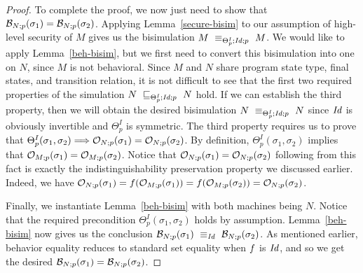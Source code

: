 \begin{proof}
To complete the proof, we now just need to show that 
$\behavior{N;p}{\sigma_1} = \behavior{N;p}{\sigma_2}$. Applying
Lemma~\ref{secure-bisim} to our assumption of high-level security of $M$
gives us the bisimulation $\bisimu{M}{M}{\Theta^{I}_p;\mathid;p}$.
We would like to apply Lemma~\ref{beh-bisim}, but we first need
to convert this bisimulation into one on $N$, since $M$ is not
behavioral. Since $M$ and $N$ share program state type, final states,
and transition relation, it is not difficult to see that the first
two required properties of the simulation $\simu{N}{N}{\Theta^{I}_p;\mathid;p}$ 
hold. If we can establish the third property, then we will obtain the
desired bisimulation $\bisimu{N}{N}{\Theta^{I}_p;\mathid;p}$ since $\mathid$ 
is obviously invertible and $\Theta^{I}_p$ is symmetric. The third
property requires us to prove that 
$\Theta^{I}_p(\sigma_1,\sigma_2) \Longrightarrow 
\observem{N}{p}{\sigma_1} = \observem{N}{p}{\sigma_2}$.
By definition, $\Theta^{I}_p(\sigma_1,\sigma_2)$ implies that
$\observem{M}{p}{\sigma_1} = \observem{M}{p}{\sigma_2}$.
Notice that $\observem{N}{p}{\sigma_1} = \observem{N}{p}{\sigma_2}$
following from this fact is exactly the indistinguishability 
preservation property we discussed earlier. Indeed, we
have $\observem{N}{p}{\sigma_1} = \obsrel{R}(\observem{M}{p}{\sigma_1}) = 
\obsrel{R}(\observem{M}{p}{\sigma_2}) = \observem{N}{p}{\sigma_2}$.

Finally, we instantiate Lemma~\ref{beh-bisim} with both machines
being $N$. Notice that the required
precondition $\Theta^{I}_p(\sigma_1,\sigma_2)$ holds by assumption.
Lemma~\ref{beh-bisim} now gives us the conclusion
$\bisimu{\behavior{N;p}{\sigma_1}}{\behavior{N;p}{\sigma_2}}{\mathid}$.
As mentioned earlier, behavior equality reduces to standard set
equality when $\obsrel{R}$ is $\mathid$, and so we get the desired
$\behavior{N;p}{\sigma_1} = \behavior{N;p}{\sigma_2}$. 
\end{proof}




